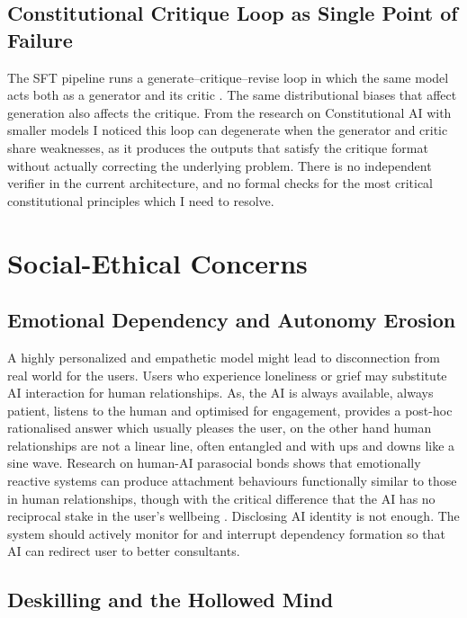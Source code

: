 \documentclass[11pt,a4paper]{article}
\begin{document}
\subsection{Constitutional Critique Loop as Single Point of Failure}

The SFT pipeline runs a generate--critique--revise loop in which the same model acts both as a generator and its critic \cite{cai2022}. The same distributional biases that affect generation also affects the critique. From the research on Constitutional AI with smaller models \cite{cai_llama} I noticed this loop can degenerate when the generator and critic share weaknesses, as it produces the outputs that satisfy the critique format without actually correcting the underlying problem. There is no independent verifier in the current architecture, and no formal checks for the most critical constitutional principles which I need to resolve.

\section{Social-Ethical Concerns}
\label{sec:ethics}

\subsection{Emotional Dependency and Autonomy Erosion}

A highly personalized and empathetic model might lead to disconnection from real world for the users. Users who experience loneliness or grief may substitute AI interaction for human relationships. As, the AI is always available, always patient, listens to the human and optimised for engagement, provides a post-hoc rationalised answer which usually pleases the user, on the other hand human relationships are not a linear line, often entangled and with ups and downs like a sine wave. Research on human-AI parasocial bonds shows that emotionally reactive systems can produce attachment behaviours functionally similar to those in human relationships, though with the critical difference that the AI has no reciprocal stake in the user's wellbeing \cite{syntheticattachment}. Disclosing AI identity is not enough. The system should actively monitor for and interrupt dependency formation so that AI can redirect user to better consultants.

\subsection{Deskilling and the Hollowed Mind}
\end{document}
